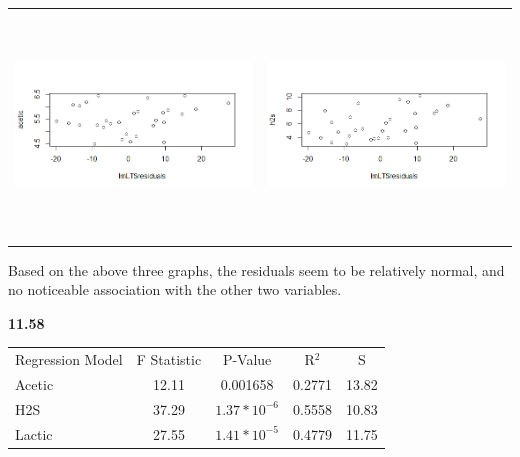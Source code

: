 \documentclass[12pt]{article}
\renewcommand\part[1]{\vspace{.10in}\textbf{#1}\par}
\begin{document}
\begin{center}
	\begin{tabular}{cc}
		\includegraphics[width=.5\textwidth, height=60mm, keepaspectratio]{images/1157/lactic_taste_residuals_vs_acetic.png} & \includegraphics[width=.5\textwidth, height=60mm, keepaspectratio]{images/1157/lactic_taste_residuals_vs_h2s.png}\\
	\end{tabular}\par
	Based on the above three graphs, the residuals seem to be relatively normal, and no noticeable association with the other two variables.\par
	\end{center}\par

\newpage
\part{11.58}
	\begin{center}
	\begin{tabular}{lcccc}
		Regression Model & F Statistic & P-Value & R$^{2}$ & S\\
		Acetic & 12.11 & 0.001658 & 0.2771 & 13.82\\
		H2S & 37.29 & $1.37*10^{-6}$ & 0.5558 & 10.83\\
		Lactic & 27.55 & $1.41*10^{-5}$ &  0.4779 & 11.75\\
	\end{tabular}
	\end{center}\par
	
\end{document}
